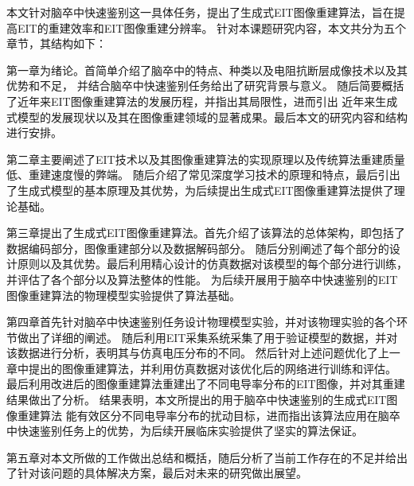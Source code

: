 
本文针对脑卒中快速鉴别这一具体任务，提出了生成式EIT图像重建算法，旨在提高EIT的重建效率和EIT图像重建分辨率。
针对本课题研究内容，本文共分为五个章节，其结构如下：

第一章为绪论。首简单介绍了脑卒中的特点、种类以及电阻抗断层成像技术以及其优势和不足，
并结合脑卒中快速鉴别任务给出了研究背景与意义。 随后简要概括了近年来EIT图像重建算法的发展历程，并指出其局限性，进而引出
近年来生成式模型的发展现状以及其在图像重建领域的显著成果。最后本文的研究内容和结构进行安排。

第二章主要阐述了EIT技术以及其图像重建算法的实现原理以及传统算法重建质量低、重建速度慢的弊端。
随后介绍了常见深度学习技术的原理和特点，最后引出了生成式模型的基本原理及其优势，为后续提出生成式EIT图像重建算法提供了理论基础。

第三章提出了生成式EIT图像重建算法。首先介绍了该算法的总体架构，即包括了数据编码部分，图像重建部分以及数据解码部分。
随后分别阐述了每个部分的设计原则以及其优势。最后利用精心设计的仿真数据对该模型的每个部分进行训练，并评估了各个部分以及算法整体的性能。
为后续开展用于脑卒中快速鉴别的EIT图像重建算法的物理模型实验提供了算法基础。

第四章首先针对脑卒中快速鉴别任务设计物理模型实验，并对该物理实验的各个环节做出了详细的阐述。
随后利用EIT采集系统采集了用于验证模型的数据，并对该数据进行分析，表明其与仿真电压分布的不同。
然后针对上述问题优化了上一章中提出的图像重建算法，并利用仿真数据对该优化后的网络进行训练和评估。
最后利用改进后的图像重建算法重建出了不同电导率分布的EIT图像，并对其重建结果做出了分析。
结果表明，本文所提出的用于脑卒中快速鉴别的生成式EIT图像重建算法
能有效区分不同电导率分布的扰动目标，进而指出该算法应用在脑卒中快速鉴别任务上的优势，为后续开展临床实验提供了坚实的算法保证。

第五章对本文所做的工作做出总结和概括，随后分析了当前工作存在的不足并给出了针对该问题的具体解决方案，最后对未来的研究做出展望。
